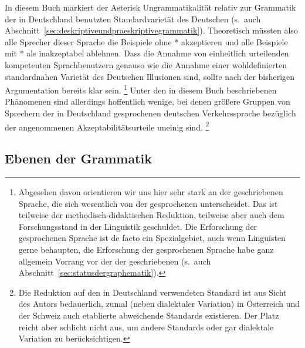 In diesem Buch markiert der Asterisk Ungrammatikalität relativ zur Grammatik der in Deutschland benutzten Standardvarietät des Deutschen (s.\ auch Abschnitt~\ref{sec:deskriptiveundpraeskriptivegrammatik}).
Theoretisch müssten also alle Sprecher dieser Sprache die Beispiele ohne * akzeptieren und alle Beispiele mit * als inakzeptabel ablehnen.
Dass die Annahme von einheitlich urteilenden kompetenten Sprachbenutzern genauso wie die Annahme einer wohldefinierten standardnahen Varietät des Deutschen Illusionen sind, sollte nach der bisherigen Argumentation bereits klar sein.%
\footnote{Abgesehen davon orientieren wir uns hier sehr stark an der geschriebenen Sprache, die sich wesentlich von der gesprochenen unterscheidet.
Das ist teilweise der methodisch-didaktischen Reduktion, teilweise aber auch dem Forschungsstand in der Linguistik geschuldet.
Die Erforschung der gesprochenen Sprache ist de facto ein Spezialgebiet, auch wenn Linguisten gerne behaupten, die Erforschung der gesprochenen Sprache habe ganz allgemein Vorrang vor der der geschriebenen (s.\ auch Abschnitt~\ref{sec:statusdergraphematik}).}
Unter den in diesem Buch beschriebenen Phänomenen sind allerdings hoffentlich wenige, bei denen größere Gruppen von Sprechern der in Deutschland gesprochenen deutschen Verkehrssprache bezüglich der angenommenen Akzeptabilitätsurteile uneinig sind.%
\footnote{Die Reduktion auf den in Deutschland verwendeten Standard ist aus Sicht des Autors bedauerlich, zumal (neben dialektaler Variation) in Österreich und der Schweiz auch etablierte abweichende Standards existieren.
Der Platz reicht aber schlicht nicht aus, um andere Standards oder gar dialektale Variation zu berücksichtigen.}

\subsection{Ebenen der Grammatik}
\label{sec:ebenendergrammatik}


